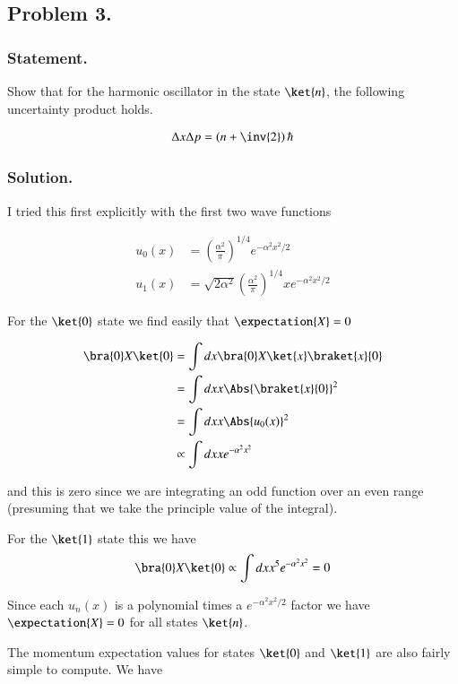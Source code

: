 \subsection{Problem 3.}
\subsubsection{Statement.}
Show that for the harmonic oscillator in the state $\ket{n}$, the following uncertainty product holds.

\begin{align}\label{eqn:desaiCh9:300}
\Delta x \Delta p = \left( n + \inv{2} \right) \hbar
\end{align}

\subsubsection{Solution.}

I tried this first explicitly with the first two wave functions

\begin{align}\label{eqn:desaiCh9:301}
u_0(x) &= \left(\frac{\alpha^2}{\pi}\right)^{1/4} e^{- \alpha^2 x^2/2} \\
u_1(x) &= \sqrt{2 \alpha^2} \left(\frac{\alpha^2}{\pi}\right)^{1/4} x e^{- \alpha^2 x^2/2}
\end{align}

For the $\ket{0}$ state we find easily that $\expectation{X} = 0$

\begin{align*}
\bra{0} X \ket{0} 
&=
\int dx \bra{0} X \ket{x} \braket{x}{0} \\
&=
\int dx x \Abs{\braket{x}{0}}^2 \\
&=
\int dx x \Abs{u_0(x)}^2 \\
&\propto
\int dx x e^{-\alpha^2 x^2} 
\end{align*}

and this is zero since we are integrating an odd function over an even range (presuming that we take the principle value of the integral).

For the $\ket{1}$ state this we have
\begin{align*}
\bra{0} X \ket{0} 
\propto
\int dx x^5 e^{-\alpha^2 x^2} 
= 0
\end{align*}

Since each $u_n(x)$ is a polynomial times a $e^{-\alpha^2 x^2/2}$ factor we have $\expectation{X} = 0$ for all states $\ket{n}$.

The momentum expectation values for states $\ket{0}$ and $\ket{1}$ are also fairly simple to compute.  We have

